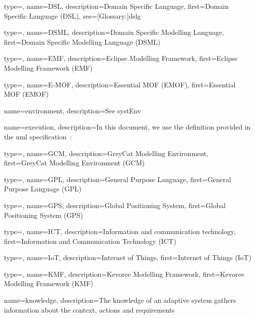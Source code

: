 {
	type=\acronymtype,
	name={DSL},
	description={Domain Specific Language},
	first={Domain Specific Language (DSL)},
	see=[Glossary:]{dslg}
}

{
	type=\acronymtype,
	name={DSML},
	description={Domain Specific Modelling Language},
	first={Domain Specific Modelling Language (DSML)}
}

{
	type=\acronymtype,
	name={EMF},
	description={Eclipse Modelling Framework},
	first={Eclipse Modelling Framework (EMF)}
}

{
	type=\acronymtype,
	name={E-MOF},
	description={Essential MOF (EMOF)},
	first={Essential MOF (EMOF)}
}

{
	name={envi\-ron\-ment},
	description={See \gls{systEnv}}
}

{
	name={exe\-cu\-tion},
	description={In this document, we use the definition provided in the \gls{uml} specification~\cite{omg2017umlspec}: }
}

{
	type=\acronymtype,
	name={GCM},
	description={GreyCat Modelling Environment},
	first={GreyCat Modelling Environment (GCM)}
}

{
	type=\acronymtype,
	name={GPL},
	description={General Purpose Language},
	first={General Purpose Language (GPL)}
}

{
	type=\acronymtype,
	name={GPS},
	description={Global Positioning System},
	first={Global Positioning System (GPS)}
}

{
	type=\acronymtype,
	name={ICT},
	description={Information and communication technology},
	first={Information and Communication Technology (ICT)}
}

{
	type=\acronymtype,
	name={IoT},
	description={Internet of Things},
	first={Internet of Things (IoT)}
}

{
	type=\acronymtype,
	name={KMF},
	description={Kevoree Modelling Framework},
	first={Kevoree Modelling Framework (KMF)}
}

{
	name={knowl\-ed\-ge},
	description={The knowledge of an adaptive system gathers information about the \gls{context}, \glspl{action} and \glspl{requirement}}
}

